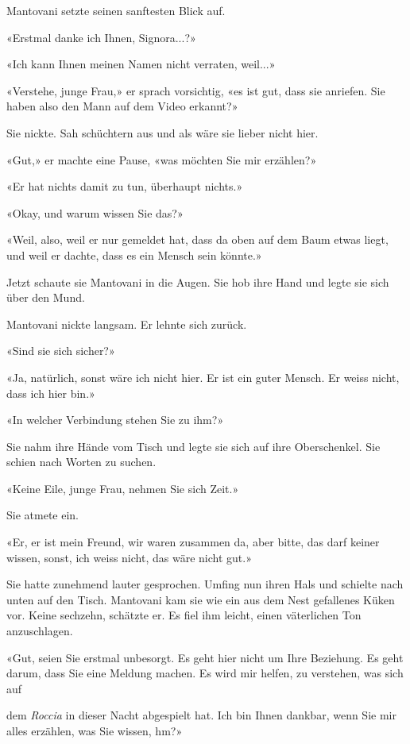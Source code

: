 Mantovani setzte seinen sanftesten Blick auf.

«Erstmal danke ich Ihnen, Signora...?»

«Ich kann Ihnen meinen Namen nicht verraten, weil...»

«Verstehe, junge Frau,» er sprach vorsichtig, «es ist gut, dass sie
anriefen. Sie haben also den Mann auf dem Video erkannt?»

Sie nickte. Sah schüchtern aus und als wäre sie lieber nicht hier.

«Gut,» er machte eine Pause, «was möchten Sie mir erzählen?»

«Er hat nichts damit zu tun, überhaupt nichts.»

«Okay, und warum wissen Sie das?»

«Weil, also, weil er nur gemeldet hat, dass da oben auf dem Baum etwas
liegt, und weil er dachte, dass es ein Mensch sein könnte.»

Jetzt schaute sie Mantovani in die Augen. Sie hob ihre Hand und legte
sie sich über den Mund.

Mantovani nickte langsam. Er lehnte sich zurück.

«Sind sie sich sicher?»

«Ja, natürlich, sonst wäre ich nicht hier. Er ist ein guter Mensch. Er
weiss nicht, dass ich hier bin.»

«In welcher Verbindung stehen Sie zu ihm?»

Sie nahm ihre Hände vom Tisch und legte sie sich auf ihre Oberschenkel.
Sie schien nach Worten zu suchen.

«Keine Eile, junge Frau, nehmen Sie sich Zeit.»

Sie atmete ein.

«Er, er ist mein Freund, wir waren zusammen da, aber bitte, das darf
keiner wissen, sonst, ich weiss nicht, das wäre nicht gut.»

Sie hatte zunehmend lauter gesprochen. Umfing nun ihren Hals und
schielte nach unten auf den Tisch. Mantovani kam sie wie ein aus dem
Nest gefallenes Küken vor. Keine sechzehn, schätzte er. Es fiel ihm
leicht, einen väterlichen Ton anzuschlagen.

«Gut, seien Sie erstmal unbesorgt. Es geht hier nicht um Ihre Beziehung.
Es geht darum, dass Sie eine Meldung machen. Es wird mir helfen, zu
verstehen, was sich auf

dem \emph{Roccia} in dieser Nacht abgespielt hat. Ich bin Ihnen dankbar,
wenn Sie mir alles erzählen, was Sie wissen, hm?»

